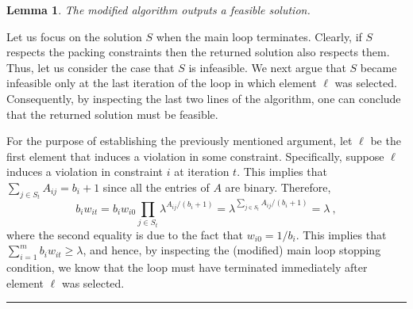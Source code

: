 \documentclass[11pt]{article}
\theoremstyle{plain}
\newtheorem{lemma}[theorem]{Lemma}
\theoremstyle{definition}
\newcommand{\qedsymb}{\hfill{\rule{2mm}{2mm}}}
\renewenvironment{proof}{\begin{trivlist} \item[\hspace{\labelsep}{\bf \noindent Proof.\/}] }{\qedsymb\end{trivlist}}\newenvironment{proofof}[1]{\begin{trivlist} \item[\hspace{\labelsep}{\bf \noindent Proof of #1.\/}] }{\qedsymb\end{trivlist}}\newenvironment{MyEqn}[1]{\setlength\arraycolsep{2pt}\begin{eqnarray*} #1}{\end{eqnarray*}}
\begin{document}
\begin{lemma} \label{lemma:0-1-Feasibility}
The modified algorithm outputs a feasible solution.
\end{lemma}
\begin{proof}
Let us focus on the solution $S$ when the main loop terminates.
Clearly, if $S$ respects the packing constraints then the returned
solution also respects them. Thus, let us consider the case that
$S$ is infeasible. We next argue that $S$ became infeasible only
at the last iteration of the loop in which element $\ell$ was
selected. Consequently, by inspecting the last two lines of the
algorithm, one can conclude that the returned solution must be
feasible.

For the purpose of establishing the previously mentioned argument,
let $\ell$ be the first element that induces a violation in some
constraint. Specifically, suppose $\ell$ induces a violation in
constraint $i$ at iteration $t$. This implies that $\sum_{j \in
S_t} A_{ij} = b_i + 1$ since all the entries of $A$ are binary.
Therefore,
$$
b_i w_{it} = b_i w_{i0} \prod_{j \in S_t} \lambda^{A_{ij} / (b_i +
1)} = \lambda^{\sum_{j \in S_t} A_{ij} / (b_i + 1)} = \lambda \ ,
$$
where the second equality is due to the fact that $w_{i0} = 1 /
b_i$. This implies that $\sum_{i=1}^m b_i w_{it} \geq \lambda$,
and hence, by inspecting the (modified) main loop stopping
condition, we know that the loop must have terminated immediately
after element $\ell$ was selected.~
\end{proof}
\end{document}
